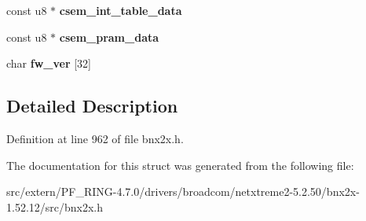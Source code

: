 \begin{DoxyCompactItemize}
\item 
\hypertarget{structbnx2x_aafc89a846e7a750e430f8f9783ee6c07}{
const u8 $\ast$ {\bfseries csem\_\-int\_\-table\_\-data}}
\label{structbnx2x_aafc89a846e7a750e430f8f9783ee6c07}

\item 
\hypertarget{structbnx2x_abd05d23d515f2de369973240fbe46726}{
const u8 $\ast$ {\bfseries csem\_\-pram\_\-data}}
\label{structbnx2x_abd05d23d515f2de369973240fbe46726}

\item 
\hypertarget{structbnx2x_afb9953bcf37697debfa19c47911d5c2a}{
char {\bfseries fw\_\-ver} \mbox{[}32\mbox{]}}
\label{structbnx2x_afb9953bcf37697debfa19c47911d5c2a}

\end{DoxyCompactItemize}


\subsection{Detailed Description}


Definition at line 962 of file bnx2x.h.



The documentation for this struct was generated from the following file:\begin{DoxyCompactItemize}
\item 
src/extern/PF\_\-RING-\/4.7.0/drivers/broadcom/netxtreme2-\/5.2.50/bnx2x-\/1.52.12/src/bnx2x.h\end{DoxyCompactItemize}
